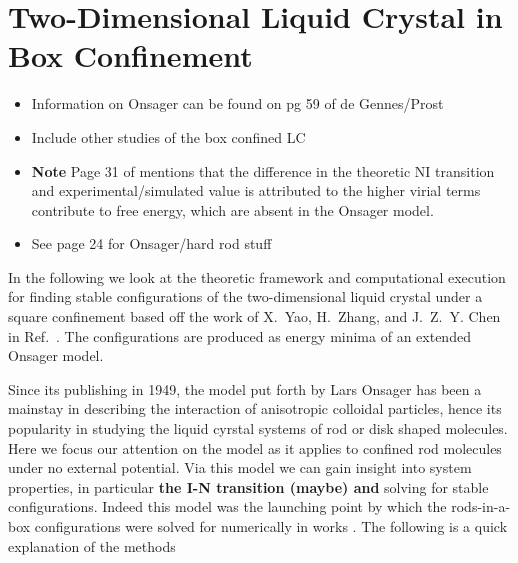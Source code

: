 
\section{Two-Dimensional Liquid Crystal in Box Confinement}
\begin{itemize}
	\item Information on Onsager can be found on pg 59 of de Gennes/Prost
	\item Include other studies of the box confined LC	
	\item \textbf{Note} Page 31 of \cite{chen2016theory} mentions that the difference in the theoretic NI transition and experimental/simulated value is attributed to the higher virial terms contribute to free energy, which are absent in the Onsager model.
	\item See \cite{chen2016theory} page 24 for Onsager/hard rod stuff
	
\end{itemize}

In the following we look at the theoretic framework  and computational execution for finding stable configurations of the two-dimensional liquid crystal under a square confinement based off the work of X.~Yao, H.~Zhang, and J.~Z.~Y. Chen in Ref.~\cite{yao}. The configurations are produced as energy minima of an extended Onsager model. 


Since its publishing in 1949, the model put forth by Lars Onsager  \cite{onsager1949} has been a mainstay in describing the interaction of anisotropic colloidal particles, hence its popularity in studying the liquid cyrstal systems of rod or disk shaped molecules.
Here we focus our attention on the model as it applies to confined rod molecules under no external potential. Via this model we can gain insight into system properties, in particular \textbf{the I-N transition (maybe) and} solving for stable configurations.
Indeed this model was the launching point by which the rods-in-a-box configurations were solved for numerically in works \cite{yao,chen2013rods}.
The following is a quick explanation of the methods

